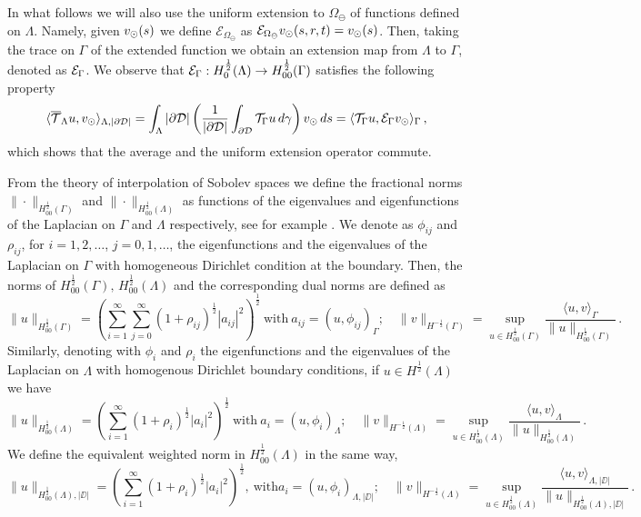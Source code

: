 \documentclass[r]{siamart171218}
\begin{document}
In what follows we will also use the uniform extension to $\Omega_{\ominus}$ of functions defined on $\Lambda$.
Namely, given $v_{\odot}(s)$ we define $\mathcal{E}_{\Omega_{\ominus}}$ as $\mathcal{E}_{\Omega_{\ominus}}v_{\odot}(s,r,t)=v_{\odot}(s)$.
Then, taking the trace on $\Gamma$ of the extended function we obtain an extension map from $\Lambda$ to $\Gamma$, denoted as $\mathcal{E}_\Gamma$.
We observe that $\mathcal{E}_\Gamma: H^\frac12_0(\Lambda) \rightarrow H^\frac12_{00}(\Gamma)$ satisfies the following property
\begin{equation}\label{eq:ext}
\langle \mtrace u, \vd \rangle_{\Lambda, |\DD|} 
= \int _{\Lambda} |\DD| \left( \frac{1}{|\DD|} \int_{\DD} \trace u \, d\gamma \right) \vd \, ds 
= \langle \trace u, \ext \vd\rangle_{\Gamma}\,,
\end{equation} 
which shows that the average and the uniform extension operator commute.

From the theory of interpolation of Sobolev spaces we define the fractional norms $\|\cdot \|_{H^{\frac 12}_{00}(\Gamma)}$ and $\|\cdot \|_{H^{\frac 12}_{00}(\Lambda)}$ as functions of the eigenvalues and eigenfunctions of the Laplacian on $\Gamma$ and $\Lambda$ respectively, see for example \cite{MR0350177,MR2328004}. 
We denote as $\phi _{ij}$ and $\rho _{ij}$, for $i=1,2,\dots$, $j=0,1,\dots$, the eigenfunctions and the eigenvalues of the Laplacian on $\Gamma$ with homogeneous Dirichlet condition at the boundary. Then, the norms of $H^{\frac 12}_{00}(\Gamma),\,H^{\frac 12}_{00}(\Lambda)$ and the corresponding dual norms are defined as
\begin{equation}\label{eq:fracnorm_gamma}
\|u\|_{H^{\frac 12}_{00}(\Gamma)}=\left(\sum_{i=1}^{\infty}\sum_{j=0}^{\infty} \left( 1+ \rho_{ij}\right)^{\frac 12}|a_{ij}|^2\right)^{\frac 12}
\ \text{with} \ a_{ij}=\left( u,\phi _{ij} \right)_{\Gamma};
\quad
\| v \|_{H^{-\frac 12}(\Gamma)} = \sup_{u\in H^{\frac 12}_{00}(\Gamma)}\frac{\langle u, v \rangle_\Gamma}{\|u\|_{H^{\frac 12}_{00}(\Gamma)}}\,.
\end{equation}
Similarly, denoting with $\phi _i$ and $\rho _i$ the eigenfunctions and the eigenvalues of the Laplacian on $\Lambda$ with homogenous Dirichlet boundary conditions, if $u \in H^{\frac 12}(\Lambda)$ we have
\begin{equation}\label{eq:fracnorm_lambda}
\|u\|_{H^{\frac 12}_{00}(\Lambda)}=\left(\sum_{i=1}^{\infty} \left( 1+ \rho_{i}\right)^{\frac 12}|a_i|^2\right)^{\frac 12}
\ \text{with} \ a_i=\left(u, \phi _i \right)_{\Lambda};
\quad
\| v \|_{H^{-\frac 12}(\Lambda)} = \sup_{u\in H^{\frac 12}_{00}(\Lambda)}\frac{\langle u, v \rangle_\Lambda}{\|u\|_{H^{\frac 12}_{00}(\Lambda)}}\,.
\end{equation}
We define the equivalent weighted norm in $H^{\frac 12}_{00}(\Lambda)$ in the same way,
\begin{equation}\label{eq:weightfracnorm}
\|u\|_{H^{\frac 12}_{00}(\Lambda), |\DD|}=\left(\sum_{i=1}^{\infty} \left( 1+ \rho_{i}\right)^{\frac 12}|a_i|^2\right)^{\frac 12},
\ \text{with} a_i=\left(u, \phi _i \right)_{\Lambda, |\DD|};
\quad
\| v \|_{H^{-\frac 12}(\Lambda)} = \sup_{u\in H^{\frac 12}_{00}(\Lambda)}\frac{\langle u, v \rangle_{\Lambda, |\DD|}}{\|u\|_{H^{\frac 12}_{00}(\Lambda), |\DD|}}\,.
\end{equation}
\end{document}
